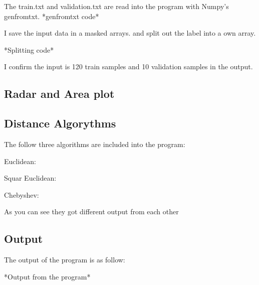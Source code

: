 \documentclass[a4paper,12pt,pdftex]{article}
\begin{document}
The train.txt and validation.txt are read into the program with Numpy's genfromtxt.
*genfromtxt code* 

I save the input data in a masked arrays. and split out the label into a own array.

*Splitting code* 

I confirm the input is 120 train samples and 10 validation samples in the output.

\subsection{Radar and Area plot}
\subsection{Distance Algorythms}

The follow three algorithms are included into the program:

Euclidean:

Squar Euclidean:

Chebyshev:

As you can see they got different output from each other
\subsection{Output}

The output of the program is as follow:

*Output from the program*

\nocite{*}



\end{document}
